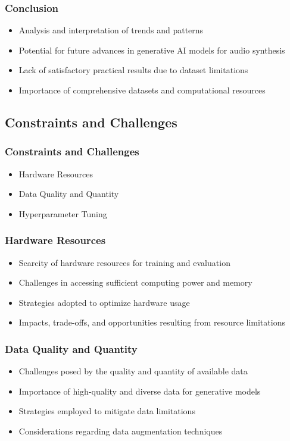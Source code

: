 \begin{frame}
    \frametitle{Conclusion}

    \begin{itemize}
        \item Analysis and interpretation of trends and patterns
        \item Potential for future advances in generative AI models for audio synthesis
        \item Lack of satisfactory practical results due to dataset limitations
        \item Importance of comprehensive datasets and computational resources
    \end{itemize}

\end{frame}

\subsection{Constraints and Challenges}

\begin{frame}
    \frametitle{Constraints and Challenges}

    \begin{itemize}
        \item Hardware Resources
        \item Data Quality and Quantity
        \item Hyperparameter Tuning
    \end{itemize}

\end{frame}

\begin{frame}
    \frametitle{Hardware Resources}

    \begin{itemize}
        \item Scarcity of hardware resources for training and evaluation
        \item Challenges in accessing sufficient computing power and memory
        \item Strategies adopted to optimize hardware usage
        \item Impacts, trade-offs, and opportunities resulting from resource limitations
    \end{itemize}

\end{frame}

\begin{frame}
    \frametitle{Data Quality and Quantity}

    \begin{itemize}
        \item Challenges posed by the quality and quantity of available data
        \item Importance of high-quality and diverse data for generative models
        \item Strategies employed to mitigate data limitations
        \item Considerations regarding data augmentation techniques
    \end{itemize}

\end{frame}

